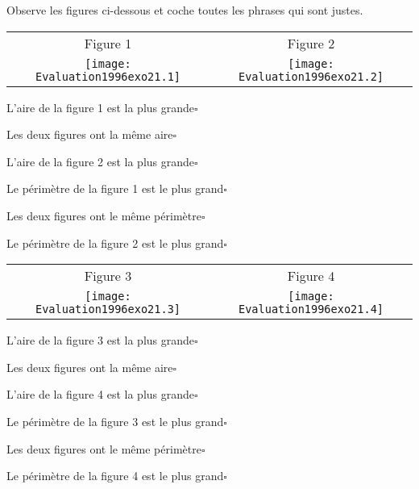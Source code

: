 Observe les figures ci-dessous et coche toutes les phrases qui sont
justes.
\begin{myenumerate}
  \item\subitem{}\par
\begin{center}
\begin{tabular}{cc}
Figure 1&Figure 2\\
\texttt{[image: Evaluation1996exo21.1]}&\texttt{[image: Evaluation1996exo21.2]}\\
\end{tabular}
\end{center}
L'aire de la figure 1 est la plus grande\hfill$\square$
\par Les deux figures ont la même aire\hfill$\square$
\par L'aire de la figure 2 est la plus grande\hfill$\square$
\par\vspace{2mm}\par
Le périmètre de la figure 1 est le plus grand\hfill$\square$
\par Les deux figures ont le même périmètre\hfill$\square$
\par Le périmètre de la figure 2 est le plus grand\hfill$\square$
\item \subitem{}\par
\begin{center}
\begin{tabular}{cc}
Figure 3&Figure 4\\
\texttt{[image: Evaluation1996exo21.3]}&\texttt{[image: Evaluation1996exo21.4]}\\
\end{tabular}
\end{center}
L'aire de la figure 3 est la plus grande\hfill$\square$
\par Les deux figures ont la même aire\hfill$\square$
\par L'aire de la figure 4 est la plus grande\hfill$\square$
\par\vspace{2mm}\par
Le périmètre de la figure 3 est le plus grand\hfill$\square$
\par Les deux figures ont le même périmètre\hfill$\square$
\par Le périmètre de la figure 4 est le plus grand\hfill$\square$
\end{myenumerate}
